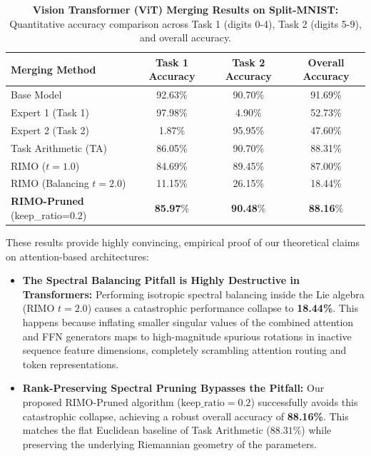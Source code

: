 \begin{table}[ht]
\centering
\caption{\textbf{Vision Transformer (ViT) Merging Results on Split-MNIST:} Quantitative accuracy comparison across Task 1 (digits 0-4), Task 2 (digits 5-9), and overall accuracy.}
\label{tab:transformer_results_table}
\vskip 0.1in
\begin{small}
\begin{sc}
\begin{tabular}{lccc}
\toprule
Merging Method & Task 1 Accuracy & Task 2 Accuracy & Overall Accuracy \\
\midrule
Base Model & 92.63\% & 90.70\% & 91.69\% \\
Expert 1 (Task 1) & 97.98\% & 4.90\% & 52.73\% \\
Expert 2 (Task 2) & 1.87\% & 95.95\% & 47.60\% \\
\midrule
Task Arithmetic (TA) & 86.05\% & 90.70\% & 88.31\% \\
RIMO ($t=1.0$) & 84.69\% & 89.45\% & 87.00\% \\
RIMO (Balancing $t=2.0$) & 11.15\% & 26.15\% & 18.44\% \\
\textbf{RIMO-Pruned} (keep\_ratio=0.2) & \textbf{85.97}\% & \textbf{90.48}\% & \textbf{88.16}\% \\
\bottomrule
\end{tabular}
\end{sc}
\end{small}
\end{table}

These results provide highly convincing, empirical proof of our theoretical claims on attention-based architectures:
\begin{itemize}
    \item \textbf{The Spectral Balancing Pitfall is Highly Destructive in Transformers:} Performing isotropic spectral balancing inside the Lie algebra (RIMO $t=2.0$) causes a catastrophic performance collapse to \textbf{18.44\%}. This happens because inflating smaller singular values of the combined attention and FFN generators maps to high-magnitude spurious rotations in inactive sequence feature dimensions, completely scrambling attention routing and token representations.
    \item \textbf{Rank-Preserving Spectral Pruning Bypasses the Pitfall:} Our proposed RIMO-Pruned algorithm ($\text{keep\_ratio}=0.2$) successfully avoids this catastrophic collapse, achieving a robust overall accuracy of \textbf{88.16\%}. This matches the flat Euclidean baseline of Task Arithmetic ($88.31\%$) while preserving the underlying Riemannian geometry of the parameters.
\end{itemize}

